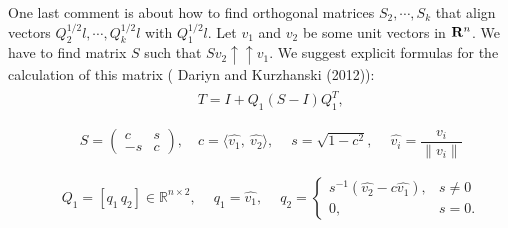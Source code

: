 \documentclass[letterpaper,10pt,english]{sphinxmanual}
\begin{document}
One last comment is about how to find orthogonal matrices
$S_2,\cdots,S_k$ that align vectors
$Q_2^{1/2}l, \cdots, Q_k^{1/2}l$ with $Q_1^{1/2}l$. Let
$v_1$ and $v_2$ be some unit vectors in ${\bf R}^n$.
We have to find matrix $S$ such that
$Sv_2\uparrow\uparrow v_1$. We suggest explicit formulas for the
calculation of this matrix ( Dariyn and Kurzhanski (2012)):
\label{chap_ellcalc:equation-valign1}\begin{gather}
\begin{split}&&T = I + Q_1(S - I)Q_1^T, \\\end{split}\label{chap_ellcalc-valign1}
\end{gather}\label{chap_ellcalc:equation-valign2}\begin{gather}
\begin{split}&&S = \begin{pmatrix}
     c & s\\
     -s & c
    \end{pmatrix},\quad c = \langle\hat{v_1},\ \hat{v_2}\rangle,\ \quad s = \sqrt{1 - c^2},\ \quad \hat{v_i} = \dfrac{v_i}{\|v_i\|}\\\end{split}\label{chap_ellcalc-valign2}
\end{gather}\label{chap_ellcalc:equation-valign3}\begin{gather}
\begin{split}&&Q_1 = [q_1 \, q_2]\in \mathbb{R}^{n\times2},\ \quad q_1 = \hat{v_1},\ \quad q_2 = \begin{cases}
s^{-1}(\hat{v_2} - c\hat{v_1}),& s\ne 0\\
0,& s = 0.
\end{cases}\end{split}\label{chap_ellcalc-valign3}
\end{gather}
\end{document}
